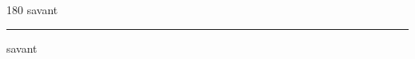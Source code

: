 
\begin{frame}
\begin{center}
\begin{turn}{180}
{\fontsize{2.5cm}{1em}\selectfont savant}
\end{turn}
\vspace{1em}\par  
\hrule
\vspace{1em}\par  
{\fontsize{2.5cm}{1em}\selectfont savant}
\end{center}
\end{frame}
